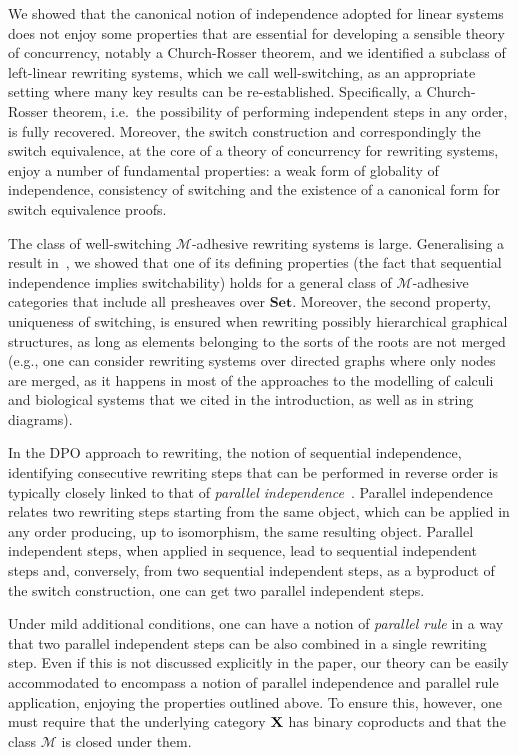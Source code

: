 \documentclass[a4paper,UKenglish,cleveref,pdftex,thm-restate,numberwithinsect]{lipics-v2021}
\newcommand{\cat}[1]{\ensuremath{\mathbf{#1}}}
\def\X{\textbf {\textup{X}}}
\begin{document}
We showed that the canonical notion of independence adopted for linear
systems does not enjoy some properties that are essential for
developing a sensible theory of concurrency, notably a Church-Rosser
theorem, and we identified a subclass of left-linear rewriting systems,
which we call well-switching, as an appropriate setting where 
many key results can be re-established. Specifically, a Church-Rosser 
theorem, i.e.~the possibility of performing independent steps in any order, is
fully recovered. Moreover, the switch construction and correspondingly
the switch equivalence, at the core of a theory of concurrency for
rewriting systems, enjoy a number of fundamental properties: a weak form of globality of independence, 
consistency of switching and
the existence of a canonical form for switch equivalence proofs.

The class of well-switching $\mathcal{M}$-adhesive rewriting systems is large. Generalising a result in~\cite{baldan2011adhesivity},
we showed that one of its defining properties (the fact that sequential independence implies switchability) holds 
for a general class of $\mathcal{M}$-adhesive categories that include all presheaves over $\cat{Set}$. Moreover, the second property, uniqueness 
of switching, is ensured when rewriting possibly hierarchical graphical structures, as long as elements belonging to the sorts 
of the roots  are not merged (e.g., one can consider rewriting systems over directed graphs where only nodes are merged, as it 
happens in most of the approaches to the modelling of calculi and biological systems that we cited in the introduction, 
as well as in string diagrams).

In the DPO approach to rewriting, the notion of sequential
independence, identifying consecutive rewriting steps that %
can be performed in reverse order is typically
closely linked to that of \emph{parallel
	independence}~\cite{ehrig2014adhesive}. Parallel independence
relates two rewriting steps starting from
the same object, %
which can be applied in
any order producing, up to isomorphism, the same resulting
object. Parallel independent steps, when applied in sequence, lead to
sequential independent steps and, conversely, from two sequential
independent steps, as a byproduct of the switch construction, one can
get two %
parallel independent steps.  

Under mild additional
conditions, one can have a notion of \emph{parallel rule} in a way that two
parallel independent steps can be also %
combined in a single rewriting step. %
%
Even if this is not discussed explicitly in the paper, our theory can be easily accommodated to encompass a notion of parallel independence and parallel rule application, enjoying the properties outlined above. To ensure this, however, one must require that the underlying category $\X$ has binary coproducts and that the class $\mathcal{M}$ is closed under them.
\end{document}
